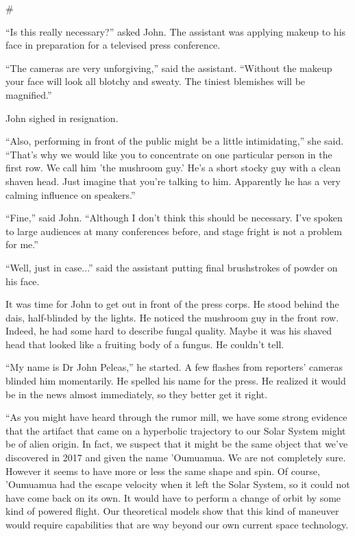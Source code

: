 \documentclass[12pt]{book}
\newcommand{\sbreak}{
\begin{center}
  \#
\end{center}
}
\begin{document}
\sbreak

``Is this really necessary?'' asked John. The assistant was applying makeup to his face in preparation for a televised press conference. 

``The cameras are very unforgiving,'' said the assistant. ``Without the makeup your face will look all blotchy and sweaty. The tiniest blemishes will be magnified.''

John sighed in resignation.

``Also, performing in front of the public might be a little intimidating,'' she said. ``That's why we would like you to concentrate on one particular person in the first row. We call him 'the mushroom guy.' He's a short stocky guy with a clean shaven head. Just imagine that you're talking to him. Apparently he has a very calming influence on speakers.''

``Fine,'' said John. ``Although I don't think this should be necessary. I've spoken to large audiences at many conferences before, and stage fright is not a problem for me.''

``Well, just in case...'' said the assistant putting final brushstrokes of powder on his face.

It was time for John to get out in front of the press corps. He stood behind the dais, half-blinded by the lights. He noticed the mushroom guy in the front row. Indeed, he had some hard to describe fungal quality. Maybe it was his shaved head that looked like a fruiting body of a fungus. He couldn't tell.

``My name is Dr John Peleas,'' he started. A few flashes from reporters' cameras blinded him momentarily. He spelled his name for the press. He realized it would be in the news almost immediately, so they better get it right.

``As you might have heard through the rumor mill, we have some strong evidence that the artifact that came on a hyperbolic trajectory to our Solar System might be of alien origin. In fact, we suspect that it might be the same object that we've discovered in 2017 and given the name 'Oumuamua. We are not completely sure. However it seems to have more or less the same shape and spin. Of course, 'Oumuamua had the escape velocity when it left the Solar System, so it could not have come back on its own. It would have to perform a change of orbit by some kind of powered flight. Our theoretical models show that this kind of maneuver would require capabilities that are way beyond our own current space technology.
\end{document}
